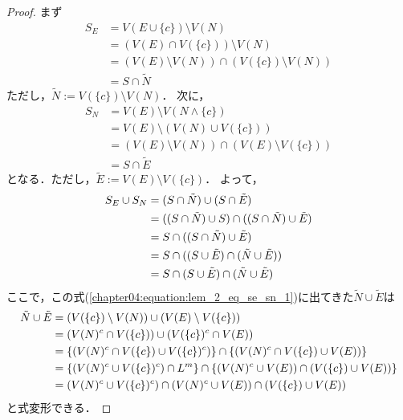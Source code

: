 \begin{proof}
	まず
	\begin{align*}
		S_E &= V(E \cup \{ c \}) \setminus V(N) \\
		&= (V(E) \cap V(\{ c \})) \setminus V(N) \\
		&= \left( V(E) \setminus V(N) \right) \cap \left( V(\{ c \}) \setminus V(N) \right) \\
		&= S \cap \tilde{N}
	\end{align*}
	ただし，$\tilde{N} :=  V(\{ c \}) \setminus V(N)$．
	次に，
	\begin{align*}
		S_N &= V(E) \setminus V(N \land \{ c \}) \\
		&= V(E) \setminus ( V(N) \cup V(\{ c \}) ) \\
		&= \left( V(E) \setminus V(N) \right) \cap \left( V(E) \setminus V(\{ c \}) \right) \\
		&= S \cap \tilde{E}
	\end{align*}
	となる．ただし，$\tilde{E} := V(E) \setminus V(\{ c \})$．
	よって，
	\begin{align}
		S_E \cup S_N &= (S \cap \tilde{N}) \cup (S \cap \tilde{E}) \notag\\
		&= ((S \cap \tilde{N}) \cup S) \cap ((S \cap \tilde{N}) \cup \tilde{E}) \notag\\
		&= S \cap ((S \cap \tilde{N}) \cup \tilde{E}) \notag\\
		&= S \cap ((S \cup \tilde{E}) \cap (\tilde{N} \cup \tilde{E})) \notag\\
		&= S \cap (S \cup \tilde{E}) \cap (\tilde{N} \cup \tilde{E}) \label{chapter04:equation:lem_2_eq_se_sn_1}
	\end{align}
	ここで，この式(\ref{chapter04:equation:lem_2_eq_se_sn_1})に出てきた$\tilde{N} \cup \tilde{E}$は
	\begin{align}
		\tilde{N} \cup \tilde{E} &= (V(\{ c \}) \setminus V(N)) \cup (V(E) \setminus V(\{ c \})) \notag \\
		&= (V(N)^c \cap V(\{ c \})) \cup (V(\{ c \})^c \cap V(E)) \notag \\
		&= \{ (V(N)^c \cap V(\{ c \}) \cup V(\{c\})^c) \} \cap \{ (V(N)^c \cap V(\{ c \}) \cup V(E)) \} \notag \\
		&= \{ (V(N)^c \cup V(\{c\})^c) \cap L^m\} \cap \{ (V(N)^c \cup V(E)) \cap (V(\{c\}) \cup V(E)) \} \notag \\
		&= (V(N)^c \cup V(\{c\})^c) \cap (V(N)^c \cup V(E)) \cap (V(\{c\}) \cup V(E)) \label{chapter04:equation:lem_2_eq_nc_ec}
	\end{align}
	と式変形できる．

\end{proof}

